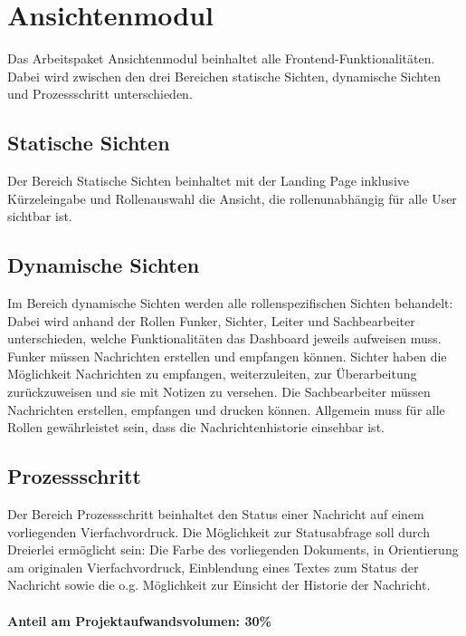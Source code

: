 \section{Ansichtenmodul} 
Das Arbeitspaket Ansichtenmodul beinhaltet alle Frontend-Funktionalitäten. 
Dabei wird zwischen den drei Bereichen statische Sichten, dynamische Sichten 
und Prozessschritt unterschieden. 
\subsection{Statische Sichten}
Der Bereich Statische Sichten beinhaltet mit der Landing Page inklusive 
Kürzeleingabe und Rollenauswahl die Ansicht, die rollenunabhängig für 
alle User sichtbar ist. 
\subsection{Dynamische Sichten}
Im Bereich dynamische Sichten werden alle rollenspezifischen Sichten 
behandelt: Dabei wird anhand der Rollen Funker, Sichter, Leiter und 
Sachbearbeiter unterschieden, welche Funktionalitäten das Dashboard jeweils 
aufweisen muss. Funker müssen Nachrichten erstellen und empfangen können.
Sichter haben die Möglichkeit Nachrichten zu empfangen, weiterzuleiten, zur 
Überarbeitung zurückzuweisen und sie mit Notizen zu versehen. Die Sachbearbeiter 
müssen Nachrichten erstellen, empfangen und drucken können. 
Allgemein muss für alle Rollen gewährleistet sein, dass die 
Nachrichtenhistorie einsehbar ist. 
\subsection{Prozessschritt}
Der Bereich Prozessschritt beinhaltet den Status einer Nachricht 
auf einem vorliegenden Vierfachvordruck. Die Möglichkeit zur Statusabfrage 
soll durch Dreierlei ermöglicht sein: Die Farbe des vorliegenden Dokuments, 
in Orientierung am originalen Vierfachvordruck, Einblendung eines 
Textes zum Status der Nachricht sowie die o.g. Möglichkeit zur Einsicht der 
Historie der Nachricht.\\ \\
\textbf{Anteil am Projektaufwandsvolumen: 30\%}